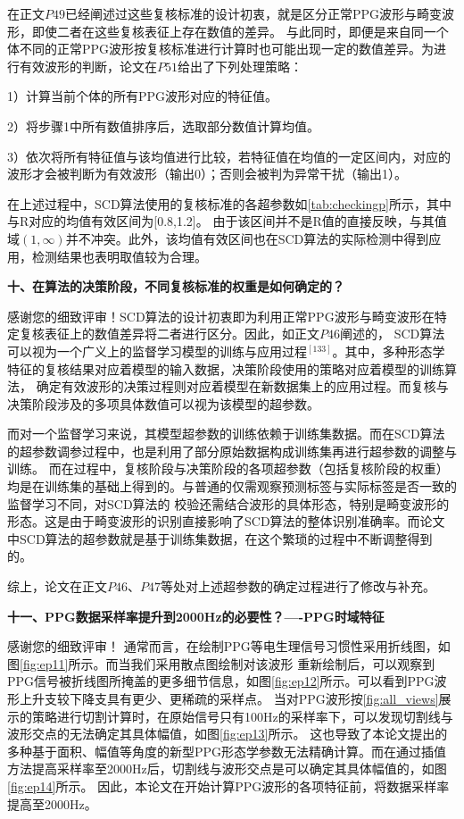 在正文$P49$已经阐述过这些复核标准的设计初衷，就是区分正常PPG波形与畸变波形，即使二者在这些复核表征上存在数值的差异。
与此同时，即便是来自同一个体不同的正常PPG波形按复核标准进行计算时也可能出现一定的数值差异。为进行有效波形的判断，论文在$P51$给出了下列处理策略：

1）计算当前个体的所有PPG波形对应的特征值。

2）将步骤1中所有数值排序后，选取部分数值计算均值。

3）依次将所有特征值与该均值进行比较，若特征值在均值的一定区间内，对应的波形才会被判断为有效波形（输出0）；否则会被判为异常干扰（输出1）。

在上述过程中，SCD算法使用的复核标准的各超参数如\autoref{tab:checkingp}所示，其中与R对应的均值有效区间为[0.8,1.2]。
由于该区间并不是R值的直接反映，与其值域$(1, \infty)$并不冲突。此外，该均值有效区间也在SCD算法的实际检测中得到应用，检测结果也表明取值较为合理。

\textbf{十、在算法的决策阶段，不同复核标准的权重是如何确定的？}

感谢您的细致评审！SCD算法的设计初衷即为利用正常PPG波形与畸变波形在特定复核表征上的数值差异将二者进行区分。因此，如正文$P46$阐述的，
SCD算法可以视为一个广义上的监督学习模型的训练与应用过程$^{[133]}$。其中，多种形态学特征的复核结果对应着模型的输入数据，决策阶段使用的策略对应着模型的训练算法，
确定有效波形的决策过程则对应着模型在新数据集上的应用过程。而复核与决策阶段涉及的多项具体数值可以视为该模型的超参数。

而对一个监督学习来说，其模型超参数的训练依赖于训练集数据。而在SCD算法的超参数调参过程中，也是利用了部分原始数据构成训练集再进行超参数的调整与训练。
而在过程中，复核阶段与决策阶段的各项超参数（包括复核阶段的权重）均是在训练集的基础上得到的。与普通的仅需观察预测标签与实际标签是否一致的监督学习不同，对SCD算法的
校验还需结合波形的具体形态，特别是畸变波形的形态。这是由于畸变波形的识别直接影响了SCD算法的整体识别准确率。而论文中SCD算法的超参数就是基于训练集数据，在这个繁琐的过程中不断调整得到的。

综上，论文在正文$P46$、$P47$等处对上述超参数的确定过程进行了修改与补充。

\textbf{十一、PPG数据采样率提升到2000Hz的必要性？----PPG时域特征}

感谢您的细致评审！
通常而言，在绘制PPG等电生理信号习惯性采用折线图，如图\autoref{fig:ep11}所示。而当我们采用散点图绘制对该波形
重新绘制后，可以观察到PPG信号被折线图所掩盖的更多细节信息，如图\autoref{fig:ep12}所示。可以看到PPG波形上升支较下降支具有更少、更稀疏的采样点。
当对PPG波形按\autoref{fig:all_views}展示的策略进行切割计算时，在原始信号只有100Hz的采样率下，可以发现切割线与波形交点的无法确定其具体幅值，如图\autoref{fig:ep13}所示。
这也导致了本论文提出的多种基于面积、幅值等角度的新型PPG形态学参数无法精确计算。而在通过插值方法提高采样率至2000Hz后，切割线与波形交点是可以确定其具体幅值的，如图\autoref{fig:ep14}所示。
因此，本论文在开始计算PPG波形的各项特征前，将数据采样率提高至2000Hz。

